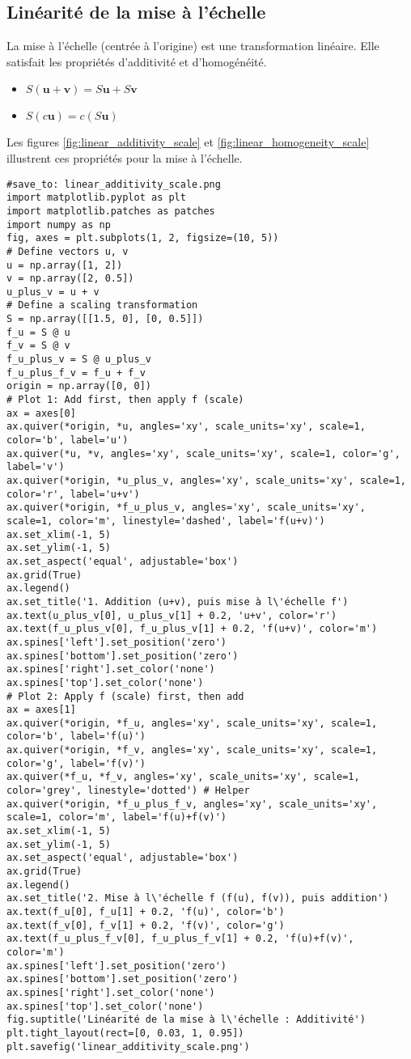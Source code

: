 \subsection{Linéarité de la mise à l'échelle}
La mise à l'échelle (centrée à l'origine) est une transformation linéaire. Elle satisfait les propriétés d'additivité et d'homogénéité.
\begin{itemize}
    \item \( S( \mathbf{u} + \mathbf{v} ) = S \mathbf{u} + S \mathbf{v} \)
    \item \( S( c \mathbf{u} ) = c (S \mathbf{u}) \)
\end{itemize}
Les figures \ref{fig:linear_additivity_scale} et \ref{fig:linear_homogeneity_scale} illustrent ces propriétés pour la mise à l'échelle.
\begin{verbatim}
#save_to: linear_additivity_scale.png
import matplotlib.pyplot as plt
import matplotlib.patches as patches
import numpy as np
fig, axes = plt.subplots(1, 2, figsize=(10, 5))
# Define vectors u, v
u = np.array([1, 2])
v = np.array([2, 0.5])
u_plus_v = u + v
# Define a scaling transformation
S = np.array([[1.5, 0], [0, 0.5]])
f_u = S @ u
f_v = S @ v
f_u_plus_v = S @ u_plus_v
f_u_plus_f_v = f_u + f_v
origin = np.array([0, 0])
# Plot 1: Add first, then apply f (scale)
ax = axes[0]
ax.quiver(*origin, *u, angles='xy', scale_units='xy', scale=1, color='b', label='u')
ax.quiver(*u, *v, angles='xy', scale_units='xy', scale=1, color='g', label='v')
ax.quiver(*origin, *u_plus_v, angles='xy', scale_units='xy', scale=1, color='r', label='u+v')
ax.quiver(*origin, *f_u_plus_v, angles='xy', scale_units='xy', scale=1, color='m', linestyle='dashed', label='f(u+v)')
ax.set_xlim(-1, 5)
ax.set_ylim(-1, 5)
ax.set_aspect('equal', adjustable='box')
ax.grid(True)
ax.legend()
ax.set_title('1. Addition (u+v), puis mise à l\'échelle f')
ax.text(u_plus_v[0], u_plus_v[1] + 0.2, 'u+v', color='r')
ax.text(f_u_plus_v[0], f_u_plus_v[1] + 0.2, 'f(u+v)', color='m')
ax.spines['left'].set_position('zero')
ax.spines['bottom'].set_position('zero')
ax.spines['right'].set_color('none')
ax.spines['top'].set_color('none')
# Plot 2: Apply f (scale) first, then add
ax = axes[1]
ax.quiver(*origin, *f_u, angles='xy', scale_units='xy', scale=1, color='b', label='f(u)')
ax.quiver(*origin, *f_v, angles='xy', scale_units='xy', scale=1, color='g', label='f(v)')
ax.quiver(*f_u, *f_v, angles='xy', scale_units='xy', scale=1, color='grey', linestyle='dotted') # Helper
ax.quiver(*origin, *f_u_plus_f_v, angles='xy', scale_units='xy', scale=1, color='m', label='f(u)+f(v)')
ax.set_xlim(-1, 5)
ax.set_ylim(-1, 5)
ax.set_aspect('equal', adjustable='box')
ax.grid(True)
ax.legend()
ax.set_title('2. Mise à l\'échelle f (f(u), f(v)), puis addition')
ax.text(f_u[0], f_u[1] + 0.2, 'f(u)', color='b')
ax.text(f_v[0], f_v[1] + 0.2, 'f(v)', color='g')
ax.text(f_u_plus_f_v[0], f_u_plus_f_v[1] + 0.2, 'f(u)+f(v)', color='m')
ax.spines['left'].set_position('zero')
ax.spines['bottom'].set_position('zero')
ax.spines['right'].set_color('none')
ax.spines['top'].set_color('none')
fig.suptitle('Linéarité de la mise à l\'échelle : Additivité')
plt.tight_layout(rect=[0, 0.03, 1, 0.95])
plt.savefig('linear_additivity_scale.png')
\end{verbatim}
